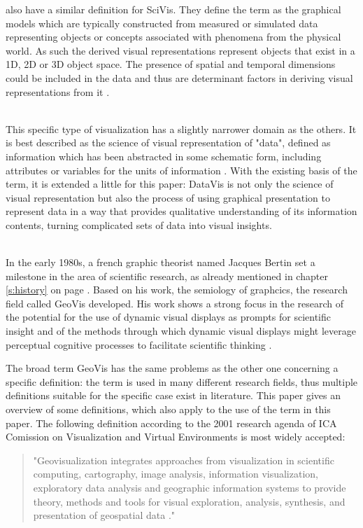 \begin{enumerate}
\citeauthor{Ferreira2003} also have a similar definition for \ac{SciVis}. They define the term as the graphical models which are typically constructed from measured or simulated data representing objects or concepts associated with phenomena from the physical world. As such the derived visual representations represent objects that exist in a 1D, 2D or 3D object space. The presence of spatial and temporal dimensions could be included in the data and thus are determinant factors in deriving visual representations from it .

 \hfill \\
This specific type of visualization has a slightly narrower domain as the others. It is best described as the science of visual representation of "data", defined as information which has been abstracted in some schematic form, including attributes or variables for the units of information .
With the existing basis of the term, it is extended a little for this paper: \ac{DataVis} is not only the science of visual representation but also the process of using graphical presentation to represent data in a way that provides qualitative understanding of its information contents, turning complicated sets of data into visual insights.

 \hfill \\
In the early 1980s, a french graphic theorist named Jacques Bertin set a milestone in the area of scientific research, as already mentioned in chapter \ref{s:history} on page \pageref{s:history}. Based on his work, the semiology of graphcics, the research field called \ac{GeoVis} developed. His work shows a strong focus in the research of the potential for the use of dynamic visual displays as prompts for scientific insight and of the methods through which dynamic visual displays might leverage perceptual cognitive processes to facilitate scientific thinking .

The broad term \ac{GeoVis} has the same problems as the other one concerning a specific definition: the term is used in many different research fields, thus multiple definitions suitable for the specific case exist in literature. This paper gives an overview of some definitions, which also apply to the use of the term in this paper.
The following definition according to the 2001 research agenda of \ac{ICA} Comission on Visualization and Virtual Environments is most widely accepted:
\begin{quote}
"Geovisualization integrates approaches from visualization in scientific computing, cartography, image analysis, information visualization, exploratory data analysis and geographic information systems to provide theory, methods and tools for visual exploration, analysis, synthesis, and presentation of geospatial data ."
\end{quote}


\end{enumerate}
